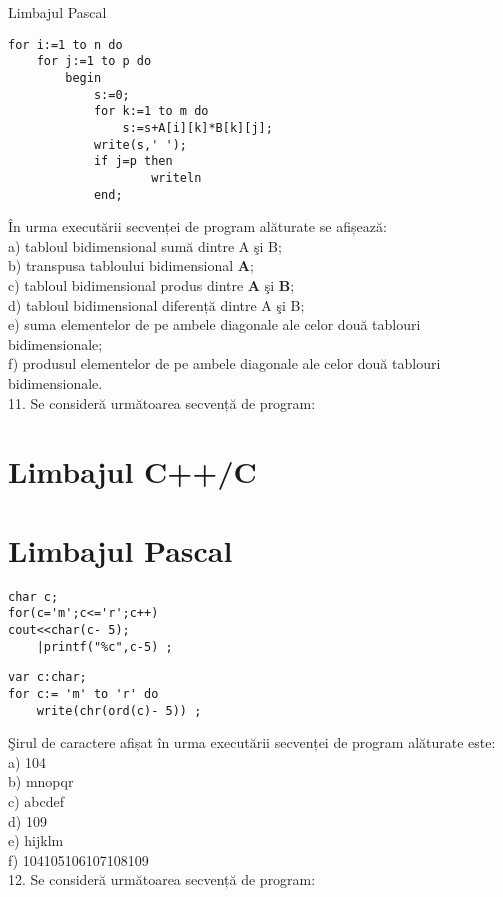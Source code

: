 Limbajul Pascal

\begin{verbatim}
for i:=1 to n do
    for j:=1 to p do
        begin
            s:=0;
            for k:=1 to m do
                s:=s+A[i][k]*B[k][j];
            write(s,' ');
            if j=p then
                    writeln
            end;
\end{verbatim}

În urma executării secvenței de program alăturate se afișează:\\
a) tabloul bidimensional sumă dintre A şi B;\\
b) transpusa tabloului bidimensional $\mathbf{A}$;\\
c) tabloul bidimensional produs dintre $\mathbf{A}$ şi $\mathbf{B}$;\\
d) tabloul bidimensional diferență dintre A şi B;\\
e) suma elementelor de pe ambele diagonale ale celor două tablouri bidimensionale;\\
f) produsul elementelor de pe ambele diagonale ale celor două tablouri bidimensionale.\\
11. Se consideră următoarea secvență de program:

\section*{Limbajul C++/C}
\section*{Limbajul Pascal}
\begin{verbatim}
char c;
for(c='m';c<='r';c++)
cout<<char(c- 5);
    |printf("%c",c-5) ;
\end{verbatim}

\begin{verbatim}
var c:char;
for c:= 'm' to 'r' do
    write(chr(ord(c)- 5)) ;
\end{verbatim}

Şirul de caractere afișat în urma executării secvenței de program alăturate este:\\
a) 104\\
b) mnopqr\\
c) abcdef\\
d) 109\\
e) hijklm\\
f) 104105106107108109\\
12. Se consideră următoarea secvență de program:

